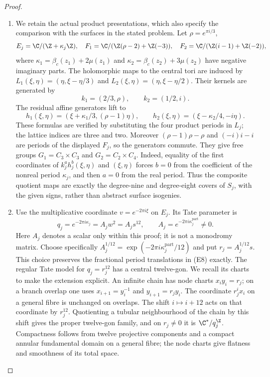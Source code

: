\begin{proof}
\begin{enumerate}[label=\arabic*.,leftmargin=*]
\item We retain the actual product presentations, which also specify the
comparison with the surfaces in the stated problem. Let
$\rho=e^{\pi i/3}$,
\[
 E_j=\C/(\Z+\kappa_j\Z),\quad
 F_1=\C/(\Z(\rho-2)+\Z(-3)),\quad
 F_2=\C/(\Z(i-1)+\Z(-2)),
\]
where $\kappa_1=\beta_c(z_1)+2\mu(z_1)$ and
$\kappa_2=\beta_c(z_2)+3\mu(z_2)$ have negative imaginary parts.
The holomorphic maps to the central tori are induced by
$L_1(\xi,\eta)=(\eta,\xi-\eta/3)$ and
$L_2(\xi,\eta)=(\eta,\xi-\eta/2)$. Their kernels are generated by
\[
 k_1=(2/3,\rho),\qquad k_2=(1/2,i).
\]
The residual affine generators lift to
\[
 h_1(\xi,\eta)=(\xi+\kappa_1/3,(\rho-1)\eta),\qquad
 h_2(\xi,\eta)=(\xi-\kappa_2/4,-i\eta).                     \tag{E8}
\]
These formulas are verified by substituting the four product periods
in $L_j$; the lattice indices are three and two. Moreover
$(\rho-1)\rho-\rho$ and $(-i)i-i$ are periods of the displayed
$F_j$, so the generators commute. They give free groups
$G_1=C_3\times C_3$ and $G_2=C_2\times C_4$. Indeed, equality of
the first coordinates of $k_j^a h_j^b(\xi,\eta)$ and $(\xi,\eta)$
forces $b=0$ from the coefficient of the nonreal period $\kappa_j$,
and then $a=0$ from the real period. Thus the composite quotient
maps are exactly the degree-nine and degree-eight covers of $S_j$,
with the given signs, rather than abstract surface isogenies.

\item Use the multiplicative coordinate $v=e^{-2\pi i\xi}$ on $E_j$.
Its Tate parameter is
\[
       q_j=e^{-2\pi i\kappa_j}=A_jw^2=A_js^{12},
       \qquad A_j=e^{-2\pi i\kappa_j^{\mathrm{part}}}\ne0.
\]
Here $A_j$ denotes a scalar only within this proof; it is not a
monodromy matrix. Choose specifically
$A_j^{1/12}=\exp(-2\pi i\kappa_j^{\mathrm{part}}/12)$ and put
$r_j=A_j^{1/12}s$. This choice preserves the fractional period
translations in (E8) exactly. The regular Tate model for $q_j=r_j^{12}$
has a central twelve-gon. We recall its charts to make the extension
explicit. An infinite chain has node charts
$x_i y_i=r_j$; on a branch overlap one uses
$x_{i+1}=y_i^{-1}$ and $y_{i+1}=r_jy_i$. The coordinate
$r_j^i x_i$ on a general fibre is unchanged on overlaps.
The shift $i\mapsto i+12$ acts on that coordinate by $r_j^{12}$.
Quotienting a tubular neighbourhood of the chain by this shift gives
the proper twelve-gon family, and on $r_j\ne0$ it is
$\C^*/q_j^\Z$. Compactness follows from twelve projective components
and a compact annular fundamental domain on a general fibre;
the node charts give flatness and smoothness of its total space.


\end{enumerate}
\end{proof}
